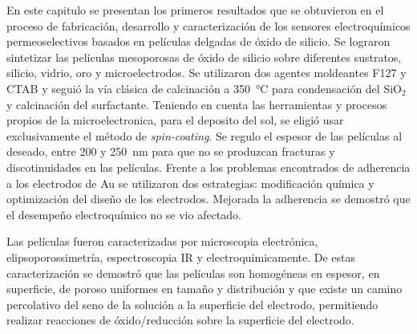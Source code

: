 	En este capitulo se presentan los primeros resultados que se obtuvieron en el proceso de fabricación, desarrollo y caracterización de los sensores electroquímicos permeoselectivos basados en películas delgadas de óxido de silicio. Se lograron sintetizar las películas mesoporosas de óxido de silicio sobre diferentes sustratos, silicio, vidrio, oro y microelectrodos. Se utilizaron dos agentes moldeantes F127 y CTAB y seguió la vía clásica de calcinación a \SI{350}{\celsius} para condensación del SiO$_2$ y calcinación del surfactante. Teniendo en cuenta las herramientas y procesos propios de la microelectronica, para el deposito del sol, se eligió usar exclusivamente el método de \textit{spin-coating}. Se regulo el espesor de las películas al deseado, entre 200 y \SI{250}{\nm} para que no se produzcan fracturas y discotinuidades en las películas. Frente a los problemas encontrados de adherencia a los electrodos de Au se utilizaron dos estrategias: modificación química y optimización del diseño de los electrodos. Mejorada la adherencia se demostró que el desempeño electroquímico no se vio afectado. 

	Las películas fueron caracterizadas por microscopia electrónica, elipsoporossimetría, espectroscopia IR y electroquimicamente. De estas caracterización se demostró que las películas son homogéneas en espesor, en superficie, de poroso uniformes en tamaño y distribución y que existe un camino percolativo del seno de la solución a la superficie del electrodo, permitiendo realizar reacciones de óxido/reducción sobre la superficie del electrodo.





